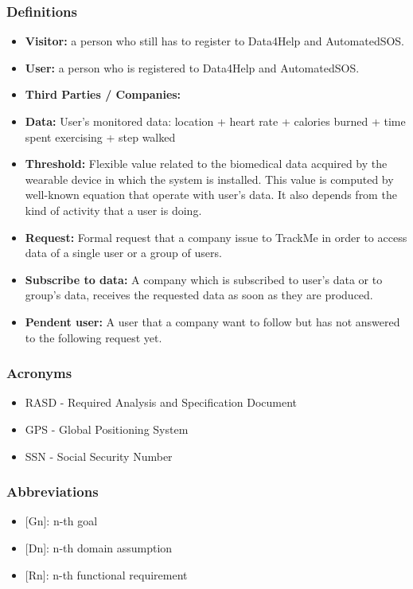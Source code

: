 \documentclass{article}
\begin{document}
\subsubsection{Definitions}
\begin{itemize}
	\item\textbf{Visitor:} a person who still has to register to Data4Help and AutomatedSOS.
	\item\textbf{User:} a person who is registered to Data4Help and AutomatedSOS.
	\item\textbf{Third Parties / Companies:} 
	\item\textbf{Data:} User's monitored data: location + heart rate + calories burned + time spent exercising + step walked 
	\item \textbf{Threshold:} Flexible value related to the biomedical data acquired by the wearable device in which the system is installed. This value is computed by well-known equation that operate with user's data. It also depends from the kind of activity that a user is doing.  
	\item \textbf{Request:} Formal request that a company issue to TrackMe in order to access data of a single user or a group of users. 
	\item \textbf{Subscribe to data:} A company which is subscribed to user's data or to group's data, receives the requested data as soon as they are produced.  
	\item \textbf{Pendent user:} A user that a company want to follow but has not answered to the following request yet.
\end{itemize}
\subsubsection{Acronyms}
\begin{itemize}
	\item RASD - Required Analysis and Specification Document
	\item GPS - Global Positioning System
	\item SSN - Social Security Number
\end{itemize}
\subsubsection{Abbreviations}
\begin{itemize}
	\item {[Gn]}: n-th goal
	\item {[Dn]}: n-th domain assumption
	\item {[Rn]}: n-th functional requirement
\end{itemize}
\end{document}
